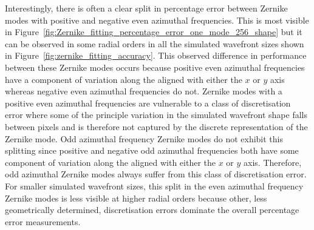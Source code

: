 Interestingly, there is often a clear split in percentage error between 
Zernike modes with positive and negative even azimuthal frequencies. This is most visible in 
Figure~\ref{fig:Zernike_fitting_percentage_error_one_mode_256_shape} but it 
can be observed in some radial orders in all the simulated wavefront sizes 
shown in Figure~\ref{fig:zernike_fitting_accuracy}. This observed difference 
in performance between these Zernike modes occurs because positive even 
azimuthal frequencies have a component of variation along the aligned with 
either the $x$ or $y$ axis whereas negative even azimuthal frequencies do 
not. Zernike modes with a positive even azimuthal frequencies are vulnerable 
to a class of discretisation error where some of the principle variation in 
the simulated wavefront shape falls between pixels and is therefore not 
captured by the discrete representation of the Zernike mode. Odd azimuthal 
frequency Zernike modes do not exhibit this splitting since positive and 
negative odd azimuthal frequencies both have some component of variation 
along the aligned with either the $x$ or $y$ axis. Therefore, odd azimuthal 
Zernike modes always suffer from this class of discretisation error. For 
smaller simulated wavefront sizes, this split in the even azimuthal frequency 
Zernike modes is less visible at higher radial orders because other, less 
geometrically determined, discretisation errors dominate the overall 
percentage error measurements.


